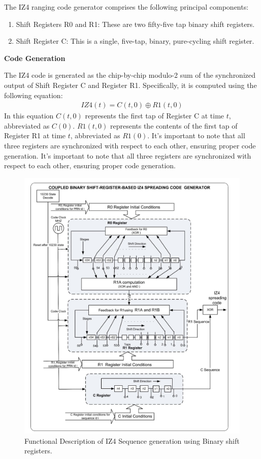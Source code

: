 \noindent The IZ4 ranging code generator comprises the following principal components:

\begin{enumerate}
    \item {Shift Registers R0 and R1:} These are two fifty-five tap binary shift registers.
    \item {Shift Register C:} This is a single, five-tap, binary, pure-cycling shift register.
\end{enumerate}

\textbf{Code Generation}

\noindent The IZ4 code is generated as the chip-by-chip modulo-2 sum of the synchronized output of Shift Register C and Register R1. Specifically, it is computed using the following equation:
\begin{align}
IZ4(t) = C(t, 0) \oplus R1(t, 0)
\label{eq:iz4} 
\end{align}
\noindent In this equation $C(t, 0)$ represents the first tap of Register C at time $t$, abbreviated as $C(0)$.
$R1(t, 0)$ represents the contents of the first tap of Register R1 at time $t$, abbreviated as $R1(0)$.
It's important to note that all three registers are synchronized with respect to each other, ensuring proper code generation.
It's important to note that all three registers are synchronized with respect to each other, ensuring proper code generation.

\begin{figure}[ht]
\centering
\includegraphics[width=0.8\columnwidth]{figs/IZ4_BCH.png}
\centering
\captionsetup{justification=centering}
\caption{Functional Description of IZ4 Sequence generation using Binary shift registers.}
\label{fig:IZ4_BCH}
\end{figure}

